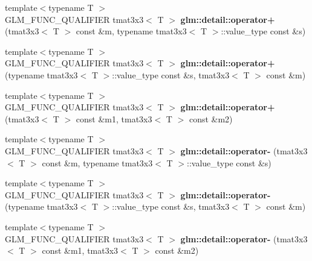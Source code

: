\begin{DoxyCompactItemize}
\item 
\hypertarget{namespaceglm_1_1detail_a57257ebf7c5a307ceccf0712faed4b4f}{{\footnotesize template$<$typename T $>$ }\\G\-L\-M\-\_\-\-F\-U\-N\-C\-\_\-\-Q\-U\-A\-L\-I\-F\-I\-E\-R tmat3x3$<$ T $>$ {\bfseries glm\-::detail\-::operator+} (tmat3x3$<$ T $>$ const \&m, typename tmat3x3$<$ T $>$\-::value\-\_\-type const \&s)}\label{namespaceglm_1_1detail_a57257ebf7c5a307ceccf0712faed4b4f}

\item 
\hypertarget{namespaceglm_1_1detail_ac6c596ee3a5aa2947daba1472261f2ec}{{\footnotesize template$<$typename T $>$ }\\G\-L\-M\-\_\-\-F\-U\-N\-C\-\_\-\-Q\-U\-A\-L\-I\-F\-I\-E\-R tmat3x3$<$ T $>$ {\bfseries glm\-::detail\-::operator+} (typename tmat3x3$<$ T $>$\-::value\-\_\-type const \&s, tmat3x3$<$ T $>$ const \&m)}\label{namespaceglm_1_1detail_ac6c596ee3a5aa2947daba1472261f2ec}

\item 
\hypertarget{namespaceglm_1_1detail_ac854a7cbeb0bf0cb6ceabcde6c3631fb}{{\footnotesize template$<$typename T $>$ }\\G\-L\-M\-\_\-\-F\-U\-N\-C\-\_\-\-Q\-U\-A\-L\-I\-F\-I\-E\-R tmat3x3$<$ T $>$ {\bfseries glm\-::detail\-::operator+} (tmat3x3$<$ T $>$ const \&m1, tmat3x3$<$ T $>$ const \&m2)}\label{namespaceglm_1_1detail_ac854a7cbeb0bf0cb6ceabcde6c3631fb}

\item 
\hypertarget{namespaceglm_1_1detail_a98d0dc0519f2e0c7f7c25ac1644d9b37}{{\footnotesize template$<$typename T $>$ }\\G\-L\-M\-\_\-\-F\-U\-N\-C\-\_\-\-Q\-U\-A\-L\-I\-F\-I\-E\-R tmat3x3$<$ T $>$ {\bfseries glm\-::detail\-::operator-\/} (tmat3x3$<$ T $>$ const \&m, typename tmat3x3$<$ T $>$\-::value\-\_\-type const \&s)}\label{namespaceglm_1_1detail_a98d0dc0519f2e0c7f7c25ac1644d9b37}

\item 
\hypertarget{namespaceglm_1_1detail_a05200abbe69f3b78e9b9f16a45630d60}{{\footnotesize template$<$typename T $>$ }\\G\-L\-M\-\_\-\-F\-U\-N\-C\-\_\-\-Q\-U\-A\-L\-I\-F\-I\-E\-R tmat3x3$<$ T $>$ {\bfseries glm\-::detail\-::operator-\/} (typename tmat3x3$<$ T $>$\-::value\-\_\-type const \&s, tmat3x3$<$ T $>$ const \&m)}\label{namespaceglm_1_1detail_a05200abbe69f3b78e9b9f16a45630d60}

\item 
\hypertarget{namespaceglm_1_1detail_ab96738489ab488d649f649b052b6e74a}{{\footnotesize template$<$typename T $>$ }\\G\-L\-M\-\_\-\-F\-U\-N\-C\-\_\-\-Q\-U\-A\-L\-I\-F\-I\-E\-R tmat3x3$<$ T $>$ {\bfseries glm\-::detail\-::operator-\/} (tmat3x3$<$ T $>$ const \&m1, tmat3x3$<$ T $>$ const \&m2)}\label{namespaceglm_1_1detail_ab96738489ab488d649f649b052b6e74a}


\end{DoxyCompactItemize}

